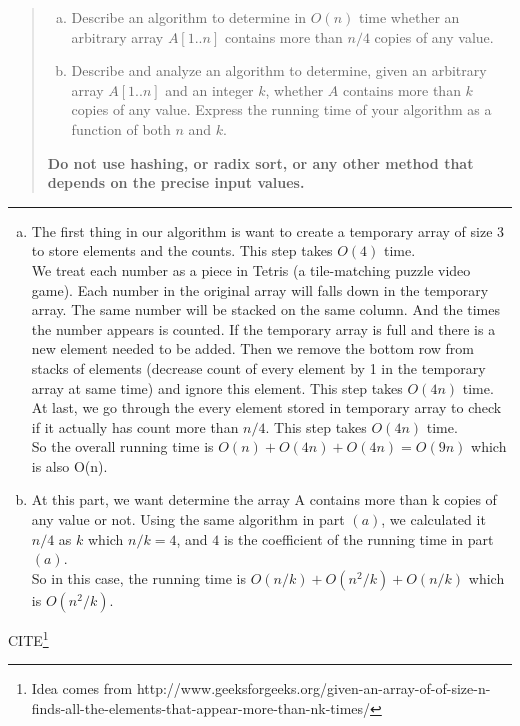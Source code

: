 \documentclass[11pt]{article}
\begin{document}



\begin{quote}

\begin{enumerate}[(a)]
	\item Describe an algorithm to determine in $O(n)$ time whether an
	arbitrary array $A[1..n]$ contains more than $n/4$ copies of any value.
	\item Describe and analyze an algorithm to determine, given an arbitrary
	array $A[1..n]$ and an integer $k$, whether $A$
	contains more than $k$ copies of any value. Express the running time
	of your algorithm as a function of both $n$ and $k$.
\end{enumerate}
{\bf Do not use hashing, or radix sort, or any other method that depends
	on the precise input values.} 

\end{quote}
\hrule

\begin{solution}
	\mbox{}
\begin{enumerate}[(a)]
\item
The first thing in our algorithm is want to create a temporary array of size 3 to store elements and the counts. This step takes $O(4)$ time.\\
We treat each number as a piece in Tetris (a tile-matching puzzle video game). Each number in the original array will falls down in the temporary array. The same number will be stacked on the same column. And the times the number appears is counted. If the temporary array is full and there is a new element needed to be added. Then we remove the bottom row from stacks of elements (decrease count of every element by 1 in the temporary array at same time) and ignore this element. This step takes $O(4n)$ time.\\ 
At last, we go through the every element stored in temporary array to check if it actually has count more than $n/4$. This step takes $O(4n)$ time.\\
So the overall running time is $O(n) + O(4n) + O(4n) = O(9n)$ which is also O(n). 
\item
At this part, we want determine the array A contains more than k copies of any value or not. Using the same algorithm in part $(a)$, we calculated it $n/4$ as $k$ which $n/k = 4$, and $4$ is the coefficient of the running time in part $(a)$.\\
So in this case, the running time is $O(n/k) + O(n^2/k) + O(n/k)$ which is $O(n^2/k)$.

\end{enumerate}
CITE\footnote{Idea comes from http://www.geeksforgeeks.org/given-an-array-of-of-size-n-finds-all-the-elements-that-appear-more-than-nk-times/}


\end{solution}
\end{document}
